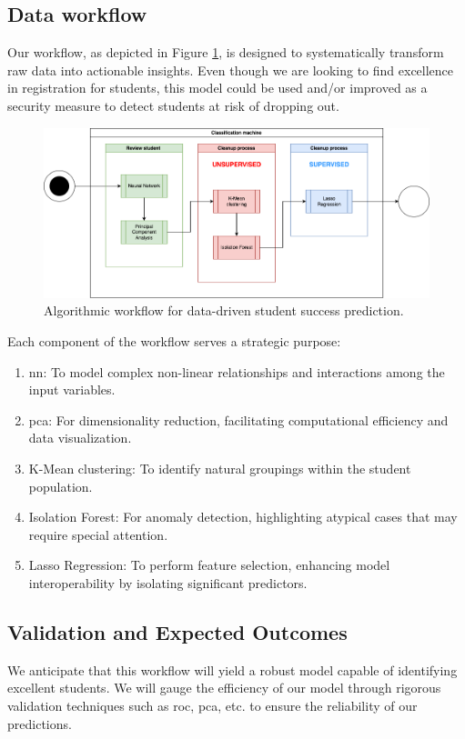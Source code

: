 \documentclass[../main.tex]{subfiles}
\begin{document}
\subsection{Data workflow}
\label{subsec:conceptualimplementation_dataworkflow}

Our workflow, as depicted in Figure \ref{fig:dataworkflow}, is designed to systematically transform raw data into actionable insights. Even though we are looking to find excellence in registration for students, this model could be used and/or improved as a security measure to detect students at risk of dropping out.

\begin{figure}
    \centering
    \includegraphics[width=1\linewidth]{res//diagram/ML Workflow.png}
    \caption{Algorithmic workflow for data-driven student success prediction.}
    \label{fig:dataworkflow}
\end{figure}

Each component of the workflow serves a strategic purpose:

\begin{enumerate}
    \item \acrfull{nn}: To model complex non-linear relationships and interactions among the input variables.
    \item \acrfull{pca}: For dimensionality reduction, facilitating computational efficiency and data visualization.
    \item K-Mean clustering: To identify natural groupings within the student population.
    \item Isolation Forest: For anomaly detection, highlighting atypical cases that may require special attention.
    \item Lasso Regression: To perform feature selection, enhancing model interoperability by isolating significant predictors.
\end{enumerate}

\subsection{Validation and Expected Outcomes}
We anticipate that this workflow will yield a robust model capable of identifying excellent students. We will gauge the efficiency of our model through rigorous validation techniques such as \acrfull{roc}, \acrfull{pca}, etc. to ensure the reliability of our predictions. 
\end{document}
